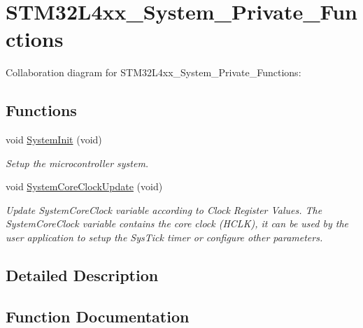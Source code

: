 \hypertarget{group__STM32L4xx__System__Private__Functions}{}\section{S\+T\+M32\+L4xx\+\_\+\+System\+\_\+\+Private\+\_\+\+Functions}
\label{group__STM32L4xx__System__Private__Functions}
Collaboration diagram for S\+T\+M32\+L4xx\+\_\+\+System\+\_\+\+Private\+\_\+\+Functions\+:
\subsection*{Functions}
\begin{DoxyCompactItemize}
\item 
void \hyperlink{group__STM32L4xx__System__Private__Functions_ga93f514700ccf00d08dbdcff7f1224eb2}{System\+Init} (void)
\begin{DoxyCompactList}\small\item\em Setup the microcontroller system. \end{DoxyCompactList}\item 
void \hyperlink{group__STM32L4xx__System__Private__Functions_gae0c36a9591fe6e9c45ecb21a794f0f0f}{System\+Core\+Clock\+Update} (void)
\begin{DoxyCompactList}\small\item\em Update System\+Core\+Clock variable according to Clock Register Values. The System\+Core\+Clock variable contains the core clock (H\+C\+LK), it can be used by the user application to setup the Sys\+Tick timer or configure other parameters. \end{DoxyCompactList}\end{DoxyCompactItemize}


\subsection{Detailed Description}


\subsection{Function Documentation}
\mbox{\label{group__STM32L4xx__System__Private__Functions_gae0c36a9591fe6e9c45ecb21a794f0f0f}} 
